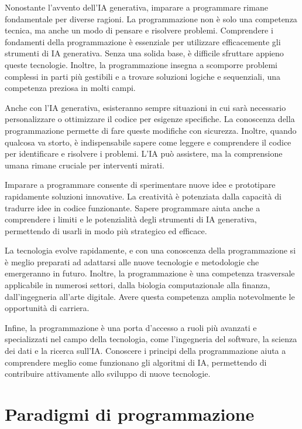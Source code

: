 \documentclass[
  letterpaper,
  DIV=11,
  numbers=noendperiod]{scrreprt}
\begin{document}
Nonostante l'avvento dell'IA generativa, imparare a programmare rimane
fondamentale per diverse ragioni. La programmazione non è solo una
competenza tecnica, ma anche un modo di pensare e risolvere problemi.
Comprendere i fondamenti della programmazione è essenziale per
utilizzare efficacemente gli strumenti di IA generativa. Senza una
solida base, è difficile sfruttare appieno queste tecnologie. Inoltre,
la programmazione insegna a scomporre problemi complessi in parti più
gestibili e a trovare soluzioni logiche e sequenziali, una competenza
preziosa in molti campi.

Anche con l'IA generativa, esisteranno sempre situazioni in cui sarà
necessario personalizzare o ottimizzare il codice per esigenze
specifiche. La conoscenza della programmazione permette di fare queste
modifiche con sicurezza. Inoltre, quando qualcosa va storto, è
indispensabile sapere come leggere e comprendere il codice per
identificare e risolvere i problemi. L'IA può assistere, ma la
comprensione umana rimane cruciale per interventi mirati.

Imparare a programmare consente di sperimentare nuove idee e prototipare
rapidamente soluzioni innovative. La creatività è potenziata dalla
capacità di tradurre idee in codice funzionante. Sapere programmare
aiuta anche a comprendere i limiti e le potenzialità degli strumenti di
IA generativa, permettendo di usarli in modo più strategico ed efficace.

La tecnologia evolve rapidamente, e con una conoscenza della
programmazione si è meglio preparati ad adattarsi alle nuove tecnologie
e metodologie che emergeranno in futuro. Inoltre, la programmazione è
una competenza trasversale applicabile in numerosi settori, dalla
biologia computazionale alla finanza, dall'ingegneria all'arte digitale.
Avere questa competenza amplia notevolmente le opportunità di carriera.

Infine, la programmazione è una porta d'accesso a ruoli più avanzati e
specializzati nel campo della tecnologia, come l'ingegneria del
software, la scienza dei dati e la ricerca sull'IA. Conoscere i principi
della programmazione aiuta a comprendere meglio come funzionano gli
algoritmi di IA, permettendo di contribuire attivamente allo sviluppo di
nuove tecnologie.

\chapter{Paradigmi di programmazione}\label{paradigmi-di-programmazione}
\end{document}
